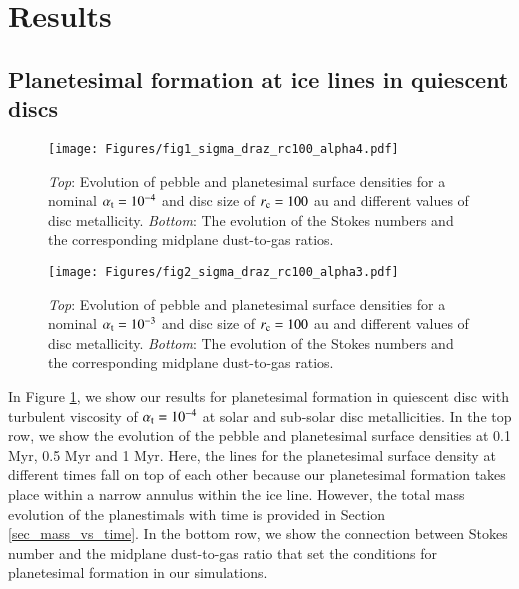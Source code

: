 \documentclass{aa}
\begin{document}
\section{Results}\label{sec:results}
\subsection{Planetesimal formation at ice lines in quiescent discs}
\begin{figure*}[h]
   \texttt{[image: Figures/fig1\_sigma\_draz\_rc100\_alpha4.pdf]}
   \caption{\textit{Top}: Evolution of pebble and planetesimal surface densities for a nominal $\alpha_{\rm t}=10^{-4}$ and disc size of $r_{\rm c}=100$ au and different values of disc metallicity. \textit{Bottom}: The evolution of the Stokes numbers and the corresponding midplane dust-to-gas ratios.}
   \label{fig:fig1}
\end{figure*}

\begin{figure*}[h]
   \texttt{[image: Figures/fig2\_sigma\_draz\_rc100\_alpha3.pdf]}
   \caption{\textit{Top}: Evolution of pebble and planetesimal surface densities for a nominal $\alpha_{\rm t}=10^{-3}$ and disc size of $r_{\rm c}=100$ au and different values of disc metallicity. \textit{Bottom}: The evolution of the Stokes numbers and the corresponding midplane dust-to-gas ratios.}
   \label{fig:fig2}
\end{figure*}

In Figure \ref{fig:fig1}, we show our results for planetesimal formation in quiescent disc with turbulent viscosity of $\alpha_{\rm t}=10^{-4}$ at solar and sub-solar disc metallicities. In the top row, we show the evolution of the pebble and planetesimal surface densities at 0.1 Myr, 0.5 Myr and 1 Myr. Here, the lines for the planetesimal surface density at different times fall on top of each other because our planetesimal formation takes place within a narrow annulus within the ice line. However, the total mass evolution of the planestimals with time is provided in Section \ref{sec_mass_vs_time}.  In the bottom row, we show the connection between Stokes number and the midplane dust-to-gas ratio that set the conditions for planetesimal formation in our simulations.
\end{document}
